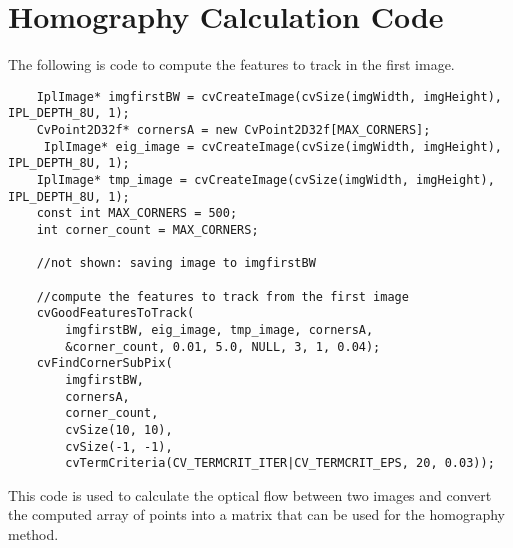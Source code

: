 \documentclass{article}
\begin{document}
\appendix

\section{Homography Calculation Code}
\label{apdx:code}

The following is code to compute the features to track in the first image.

\begin{verbatim}
    IplImage* imgfirstBW = cvCreateImage(cvSize(imgWidth, imgHeight), IPL_DEPTH_8U, 1);
    CvPoint2D32f* cornersA = new CvPoint2D32f[MAX_CORNERS];
     IplImage* eig_image = cvCreateImage(cvSize(imgWidth, imgHeight), IPL_DEPTH_8U, 1);
    IplImage* tmp_image = cvCreateImage(cvSize(imgWidth, imgHeight), IPL_DEPTH_8U, 1);
    const int MAX_CORNERS = 500;
    int corner_count = MAX_CORNERS;
 
    //not shown: saving image to imgfirstBW

    //compute the features to track from the first image
    cvGoodFeaturesToTrack(
        imgfirstBW, eig_image, tmp_image, cornersA, 
        &corner_count, 0.01, 5.0, NULL, 3, 1, 0.04);
    cvFindCornerSubPix(
        imgfirstBW, 
        cornersA, 
        corner_count, 
        cvSize(10, 10), 
        cvSize(-1, -1), 
        cvTermCriteria(CV_TERMCRIT_ITER|CV_TERMCRIT_EPS, 20, 0.03));
\end{verbatim}

This code is used to calculate the optical flow between two images and convert
the computed array of points into a matrix that can be used for the homography
method.
\end{document}
